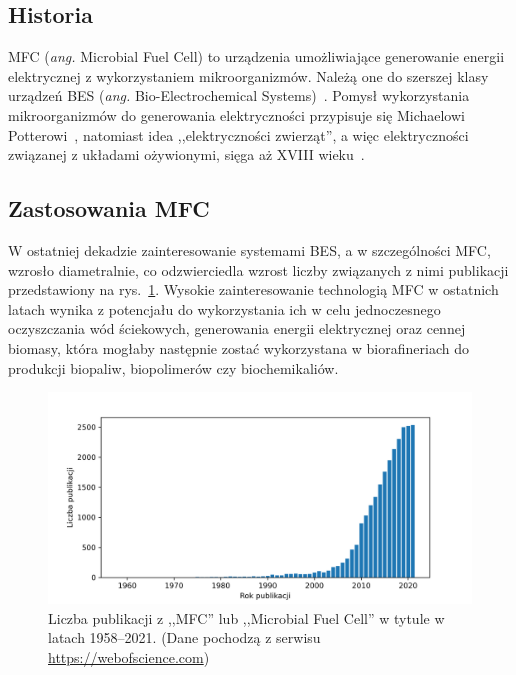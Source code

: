 \subsection{Historia}\label{subsec:historia}
MFC (\textit{ang.} Microbial Fuel Cell) to urządzenia umożliwiające
generowanie energii elektrycznej z wykorzystaniem mikroorganizmów.
Należą one do szerszej klasy urządzeń BES (\textit{ang.}
Bio-Electrochemical Systems)~\cite{Santoro2017}.
Pomysł wykorzystania mikroorganizmów do generowania elektryczności
przypisuje się Michaelowi Potterowi~\cite{Potter1911},
natomiast idea ,,elektryczności zwierząt'', a więc elektryczności
związanej z układami ożywionymi, sięga aż XVIII wieku~\cite{Santoro2017}.

\subsection{Zastosowania MFC}\label{subsec:zastosowania-mfc}
W ostatniej dekadzie zainteresowanie systemami BES,
a w szczególności MFC, wzrosło diametralnie, co odzwierciedla wzrost
liczby związanych z nimi publikacji przedstawiony na rys.~\ref{fig:1}.
Wysokie zainteresowanie technologią MFC w ostatnich latach wynika
z potencjału do wykorzystania ich w celu jednoczesnego oczyszczania
wód ściekowych, generowania energii elektrycznej oraz cennej biomasy,
która mogłaby następnie zostać wykorzystana w biorafineriach do produkcji
biopaliw, biopolimerów czy biochemikaliów.

\begin{figure}[!b]
    \centering
    \includegraphics[width=\textwidth]{figures/publications}
    \caption{
        Liczba publikacji z ,,MFC'' lub
        ,,Microbial Fuel Cell'' w tytule w latach 1958--2021.
        (Dane pochodzą z serwisu \url{https://webofscience.com})
    }
    \label{fig:1}
\end{figure}

